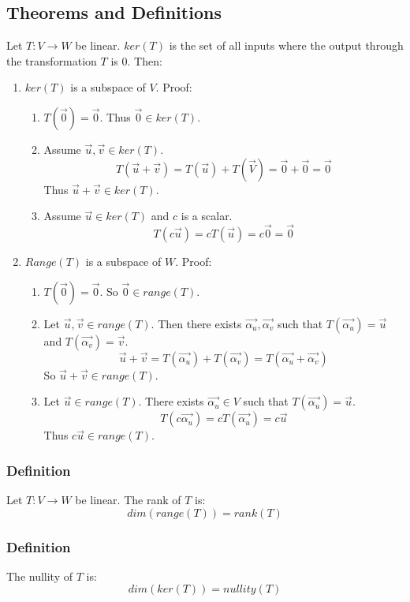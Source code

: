 \documentclass{math}
\begin{document}
\subsection*{Theorems and Definitions}
Let \( T:V\to W \) be linear. \( ker(T) \) is the set of all inputs where the
output through the transformation \( T \) is 0. Then:
\begin{enumerate}
  \item \( ker(T) \) is a subspace of \( V \). Proof:
  \begin{enumerate}
    \item \( T(\vec{0}) = \vec{0} \). Thus \( \vec{0}\in ker(T) \).
    \item Assume \( \vec{u},\vec{v}\in ker(T) \).
    \[ T(\vec{u}+\vec{v}) = T(\vec{u})+T(\vec{V}) = \vec{0}+\vec{0} = \vec{0} \]
    Thus \( \vec{u}+\vec{v}\in ker(T) \).
    \item Assume \( \vec{u}\in ker(T) \) and \( c \) is a scalar.
    \[ T(c\vec{u}) = cT(\vec{u}) = c\vec{0} = \vec{0} \]
  \end{enumerate}
  \item \( Range(T) \) is a subspace of \( W \). Proof:
  \begin{enumerate}
    \item \( T(\vec{0}) = \vec{0} \). So \( \vec{0}\in range(T) \).
    \item Let \( \vec{u},\vec{v}\in range(T) \). Then there exists
    \( \vec{\alpha_u},\vec{\alpha_v} \) such that \( T(\vec{\alpha_u}) =
    \vec{u} \) and \( T(\vec{\alpha_v}) = \vec{v} \).
    \[ \vec{u}+\vec{v} = T(\vec{\alpha_u})+T(\vec{\alpha_v}) =
      T(\vec{\alpha_u}+\vec{\alpha_v}) \]
    So \( \vec{u}+\vec{v}\in range(T) \).
    \item Let \( \vec{u}\in range(T) \). There exists \( \vec{\alpha_u}\in V \)
    such that \( T(\vec{\alpha_u}) = \vec{u} \).
    \[ T(c\vec{\alpha_u}) = cT(\vec{\alpha_u}) = c\vec{u} \]
    Thus \( c\vec{u}\in range(T) \).
  \end{enumerate}
\end{enumerate}

\subsubsection*{Definition}
Let \( T:V\to W \) be linear. The rank of \( T \) is:
\[ dim(range(T)) = rank(T) \]

\subsubsection*{Definition}
The nullity of \( T \) is:
\[ dim(ker(T)) = nullity(T) \]
\end{document}
